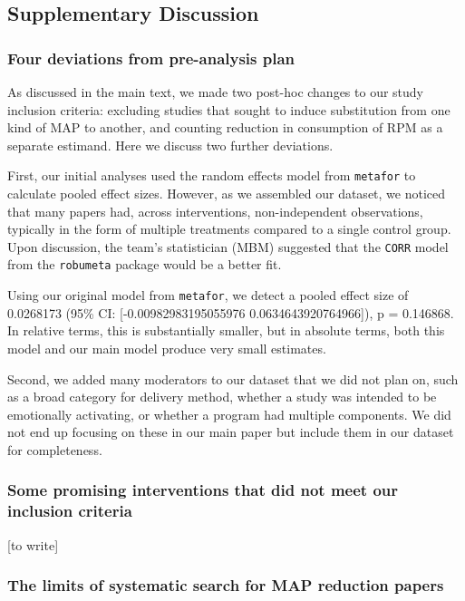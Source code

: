 \documentclass[sn-nature,referee,pdflatex]{sn-jnl}
\begin{document}
\subsection{Supplementary Discussion}\label{supplementary-discussion}

\subsubsection{Four deviations from pre-analysis
plan}\label{four-deviations-from-pre-analysis-plan}

As discussed in the main text, we made two post-hoc changes to our study
inclusion criteria: excluding studies that sought to induce substitution
from one kind of MAP to another, and counting reduction in consumption
of RPM as a separate estimand. Here we discuss two further deviations.

First, our initial analyses used the random effects model from
\texttt{metafor} to calculate pooled effect sizes. However, as we
assembled our dataset, we noticed that many papers had, across
interventions, non-independent observations, typically in the form of
multiple treatments compared to a single control group. Upon discussion,
the team's statistician (MBM) suggested that the \texttt{CORR} model
from the \texttt{robumeta} package would be a better fit.

Using our original model from \texttt{metafor}, we detect a pooled
effect size of 0.0268173 (95\% CI: {[}-0.00982983195055976
0.0634643920764966{]}), p = 0.146868. In relative terms, this is
substantially smaller, but in absolute terms, both this model and our
main model produce very small estimates.

Second, we added many moderators to our dataset that we did not plan on,
such as a broad category for delivery method, whether a study was
intended to be emotionally activating, or whether a program had multiple
components. We did not end up focusing on these in our main paper but
include them in our dataset for completeness.

\subsubsection{Some promising interventions that did not meet our
inclusion
criteria}\label{some-promising-interventions-that-did-not-meet-our-inclusion-criteria}

{[}to write{]}

\subsubsection{The limits of systematic search for MAP reduction
papers}\label{sec5.4.1}
\end{document}
